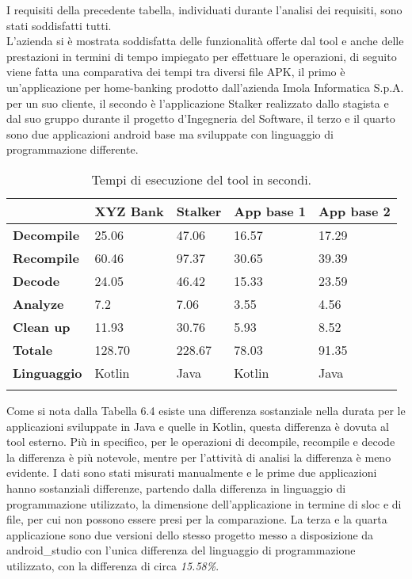I requisiti della precedente tabella, individuati durante l'analisi dei requisiti, sono stati soddisfatti tutti.\\
L'azienda si è mostrata soddisfatta delle funzionalità offerte dal tool e anche delle prestazioni in termini di tempo impiegato per effettuare le operazioni, di seguito viene fatta una comparativa dei tempi tra diversi file APK, il primo è un'applicazione per home-banking prodotto dall'azienda Imola Informatica S.p.A. per un suo cliente, il secondo è l'applicazione Stalker realizzato dallo stagista e dal suo gruppo durante il progetto d'Ingegneria del Software, il terzo e il quarto sono due applicazioni android base ma sviluppate con linguaggio di programmazione differente.
\begin{longtable}{| C{2cm}| C{2cm}| C{2.5cm}| C{2.5cm}| C{2.5cm}|}
    \hline
                       & \textbf{XYZ Bank} & \textbf{Stalker} & \textbf{App base 1} & \textbf{App base 2} \\\hline
    \textbf{Decompile}  & 25.06             & 47.06            & 16.57               & 17.29               \\\hline
    \textbf{Recompile}  & 60.46             & 97.37            & 30.65               & 39.39               \\\hline
    \textbf{Decode}     & 24.05             & 46.42            & 15.33               & 23.59               \\\hline
    \textbf{Analyze}    & 7.2               & 7.06             & 3.55                & 4.56               \\\hline
    \textbf{Clean up}   & 11.93             & 30.76            & 5.93                & 8.52                \\\hline
    \textbf{Totale}     & 128.70            & 228.67           & 78.03               & 91.35               \\\hline
    \textbf{Linguaggio} & Kotlin            & Java             & Kotlin              & Java                \\\hline
    \caption{Tempi di esecuzione del tool in secondi.}
\end{longtable}
Come si nota dalla Tabella 6.4 esiste una differenza sostanziale nella durata per le applicazioni sviluppate in Java e quelle in Kotlin, questa differenza è dovuta al tool esterno.
Più in specifico, per le operazioni di decompile, recompile e decode la differenza è più notevole, mentre per l'attività di analisi la differenza è meno evidente.
I dati sono stati misurati manualmente e le prime due applicazioni hanno sostanziali differenze, partendo dalla differenza in linguaggio di programmazione utilizzato, la dimensione dell'applicazione in termine di \gls{sloc} e di file, per cui non possono essere presi per la comparazione.
La terza e la quarta applicazione sono due versioni dello stesso progetto messo a disposizione da \gls{android_studio} con l'unica differenza del linguaggio di programmazione utilizzato, con la differenza di circa \textit{15.58\%}.
